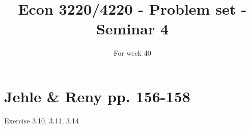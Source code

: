 \documentclass{article}
\title{Econ 3220/4220 - Problem set - Seminar 4 }
\date{For week 40}
\begin{document}
\maketitle


\section*{Jehle \& Reny pp. 156-158}

Exercise 3.10, 3.11, 3.14
\end{document}
